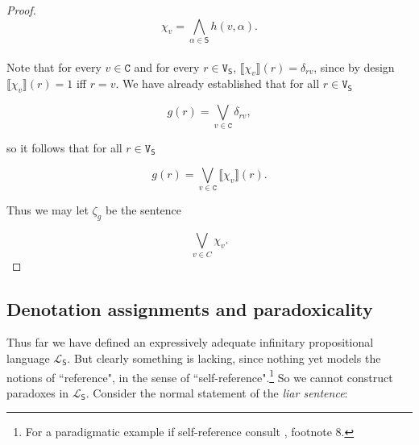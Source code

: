 \documentclass[12pt]{kluwer}
\newtheorem{defn}{Definition}
\theoremstyle{remark}
\newcommand{\fancy}[1]{\mathcal{#1}}
\def\S{\textsf{S}}
\def\V{\texttt{V}}
\def\C{\texttt{C}}
\def\L{\fancy{L}}
\begin{document}
\begin{proof}
\[\chi_v = \bigwedge_{\alpha \in \S} h(v, \alpha).\]\\


Note that for every $v \in \C$ and for every $r \in \V_{\S}$,  $\llbracket \chi_v\rrbracket(r) = \delta_{rv}$, since by design $\llbracket \chi_v\rrbracket(r)  = 1$ iff $r = v$. We have already established that for all $r \in \V_{\S}$

\[g(r) = \bigvee_{v \in \C} \delta_{rv},\]

so it follows that for all $r \in \V_{\S}$

\[g(r) = \bigvee_{v \in \C} \llbracket \chi_v\rrbracket(r).\]

Thus we may let $\zeta_g$ be the sentence 

\[\bigvee_{v \in C} \chi_v.\]
\end{proof}

%
\begin{comment}
\begin{defn}
For $\gamma \in \S^+$ we define its \emph{normal form} $\zeta_{\gamma}$ as $\zeta_{\llbracket\gamma\rrbracket}$.
\end{defn}

In our proofs, we will often encounter sentences like $\phi \wedge \neg \phi$ which always have the same semantic value.  

\begin{defn}
A sentence $\gamma \in \S^+$ is \emph{constant} if $\zeta_{\gamma} \in \{\top, \bot\}$.  Note that if $\gamma$ is a constant sentence, then there is a $c(\gamma) \in \{0, 1\}$ such that $\gamma(v) = c(\gamma)$ for every truth-value assignment $v$---we call $c(\gamma)$ the \emph{value} of the contant sentence $\gamma$.  
\end{defn}

This propositional language lacks a truth (or falsity) predicate but this leaves nothing wanting in terms of characterizing the problematic reference structures.
\end{comment}
%

\subsection{Denotation assignments and paradoxicality} 

Thus far we have defined an expressively adequate infinitary propositional language $\L_\S$. But clearly something is lacking, since nothing yet models the notions of ``reference", in the sense of ``self-reference".\footnote{For a paradigmatic example if self-reference consult \cite{danger}, footnote 8.}
So we cannot construct paradoxes in $\L_\S$. Consider the normal statement of the  \textit{liar sentence}:
\end{document}
